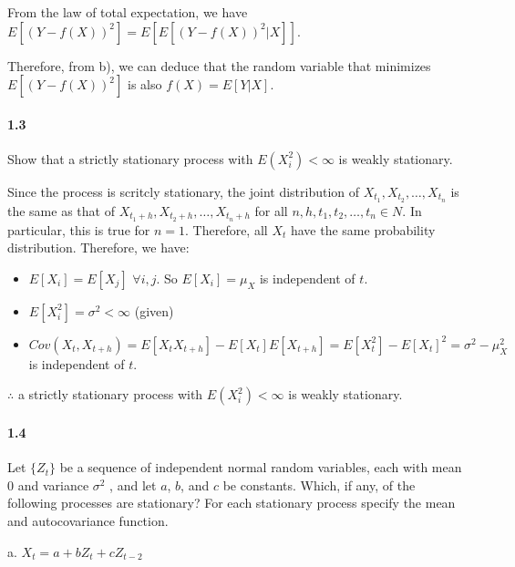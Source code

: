 \documentclass[]{article}
\let\oldparagraph\paragraph
\renewcommand{\paragraph}[1]{\oldparagraph{#1}\mbox{}}
\begin{document}
\color{blue}
From the law of total expectation, we have $E[(Y - f(X))^2] = E[E[(Y - f(X))^2|X]]$.

Therefore, from b), we can deduce that the random variable that minimizes $E[(Y - f(X))^2]$ is also $f(X) = E[Y|X]$.
\color{black}


\paragraph{1.3}
Show that a strictly stationary process with $E(X_i^2) < \infty$ is weakly stationary.

\color{blue}
Since the process is scritcly stationary, the joint distribution of $X_{t_1}, X_{t_2}, \ldots, X_{t_n}$ is the same as that of $X_{t_1+h}, X_{t_2+h}, \ldots, X_{t_n+h}$ for all $n, h, t_1, t_2, \ldots, t_n \in N$. In particular, this is true for $n=1$. Therefore, all $X_t$ have the same probability distribution. Therefore, we have:

\begin{itemize}
\item $E[X_i] = E[X_j]$ $\forall i, j$. So $E[X_i] = \mu_X$ is independent of $t$.
\item $E[X_i^2] = \sigma^2 < \infty$ (given)
\item $Cov(X_t, X_{t+h}) = E[X_tX_{t+h}] - E[X_t]E[X_{t+h}] = E[X_t^2] - E[X_t]^2 = \sigma^2 - \mu_X^2$ is independent of $t$.
\end{itemize}
$\therefore$ a strictly stationary process with $E(X_i^2) < \infty$ is weakly stationary.
\color{black}

\paragraph{1.4}
Let $\{Z_t\}$ be a sequence of independent normal random variables, each with mean $0$ and variance $\sigma^2$ , and let $a$, $b$, and $c$ be constants. Which, if any, of the following processes are stationary? For each stationary process specify the mean and autocovariance function.

a. $X_t = a + bZ_t + cZ_{t-2}$
\end{document}
